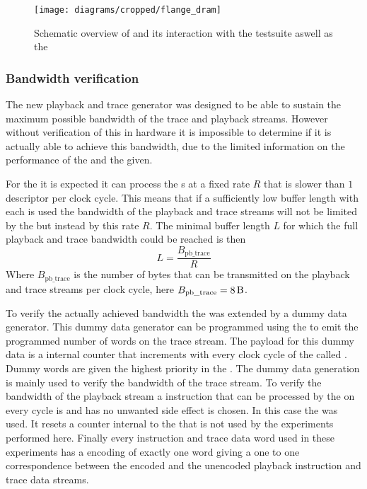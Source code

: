 \begin{figure}[htbp]
\centerline{\texttt{[image: diagrams/cropped/flange\_dram]}}
\caption{Schematic overview of \flangedram{} and its interaction with the \cpp{} testsuite aswell as the \systemverilog{} \DUT{}}\label{dia:flange-dram-overview}
\end{figure}

\subsubsection{Bandwidth verification}\label{sec:pb_trace_verif}
The new playback and trace generator was designed to be able to sustain the maximum possible bandwidth of the trace and playback streams. However without verification of this in hardware it is impossible to determine if it is actually able to achieve this bandwidth, due to the limited information on the performance of the \AXIDMA{} and the \XilinxMIG{} given.

For the \AXIDMA{} it is expected it can process the \descriptor{}s at a fixed rate $R$ that is slower than $1$ descriptor per clock cycle. This means that if a sufficiently low buffer length with each \descriptor{} is used the bandwidth of the playback and trace streams will not be limited by the \XilinxMIG{} but instead by this rate $R$.
The minimal buffer length $L$ for which the full playback and trace bandwidth could be reached is then
\[L = \frac{B_{\text{pb\_trace}}}{R}\]
Where $B_{\text{pb\_trace}}$ is the number of bytes that can be transmitted on the playback and trace streams per clock cycle, here $B_{\text{pb\_trace}} = \SI{8}{\byte}$.

To verify the actually achieved bandwidth the \pbexec{} was extended by a dummy data generator. This dummy data generator can be programmed using the \emitDummyInstr{} to emit the programmed number of words on the trace stream. The payload for this dummy data is a \FPGA{} internal counter that increments with every clock cycle of the \pbexec{} called \systime{}. Dummy words are given the highest priority in the \traceArb{}.
The dummy data generation is mainly used to verify the bandwidth of the trace stream. To verify the bandwidth of the playback stream a instruction that can be processed by the \pbexec{} on every cycle is and has no unwanted side effect is chosen. In this case the \resetSleepInstr{} was used. It resets a counter internal to the \pbexec{} that is not used by the experiments performed here. Finally every instruction and trace data word used in these experiments has a \UT{} encoding of exactly one \PhyWordSize{} word giving a one to one correspondence between the encoded and the unencoded playback instruction and trace data streams.

